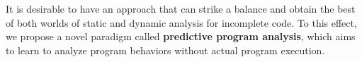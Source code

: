 It is desirable to have an approach that can strike a balance and
obtain the best of both worlds of static and dynamic analysis for
incomplete code. To this effect, we propose a novel paradigm called
{\bf predictive program analysis}, which aims to learn to analyze
program behaviors without actual program execution.




